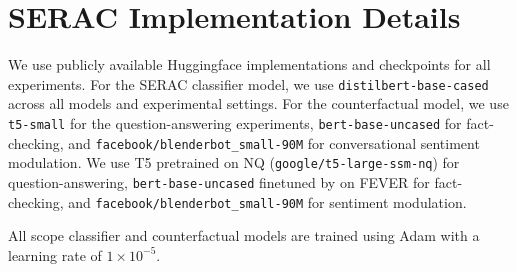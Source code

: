 \section{SERAC Implementation Details}
\label{sec:serac_impl}
We use publicly available Huggingface \cite{wolf2019hugging} implementations and checkpoints for all experiments. For the SERAC classifier model, we use \texttt{distilbert-base-cased} \cite{Sanh2019DistilBERTAD} across all models and experimental settings. For the counterfactual model, we use \texttt{t5-small} for the question-answering experiments, \texttt{bert-base-uncased} for fact-checking, and \texttt{facebook/blenderbot\_small-90M} \cite{roller2021recipes} for conversational sentiment modulation. We use T5 pretrained on NQ (\texttt{google/t5-large-ssm-nq}) for question-answering, \texttt{bert-base-uncased} finetuned by \citet{Cao2021EditingFK} on FEVER \cite{Thorne18Fever} for fact-checking, and \texttt{facebook/blenderbot\_small-90M} for sentiment modulation.

All scope classifier and counterfactual models are trained using Adam with a learning rate of $1\times 10^{-5}$. 